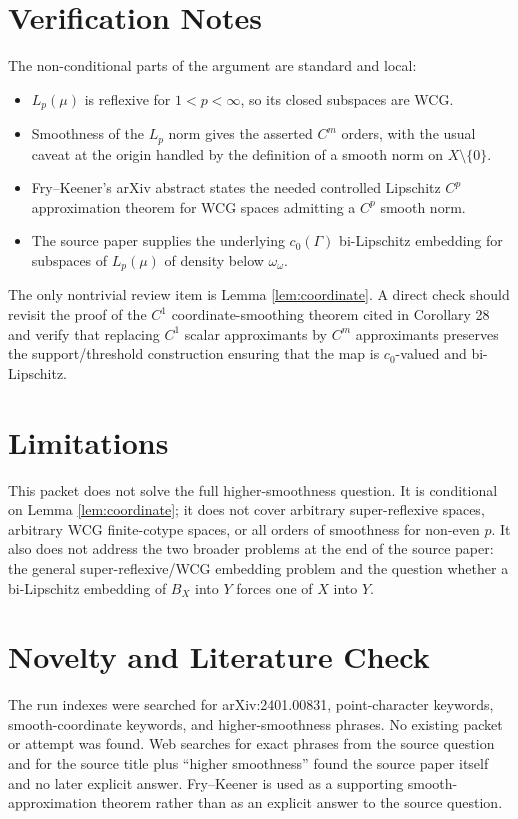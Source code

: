 \documentclass[11pt]{article}
\begin{document}
\section*{Verification Notes}

The non-conditional parts of the argument are standard and local:
\begin{itemize}
\item $L_p(\mu)$ is reflexive for $1<p<\infty$, so its closed subspaces are
WCG.
\item Smoothness of the $L_p$ norm gives the asserted $C^m$ orders, with the
usual caveat at the origin handled by the definition of a smooth norm on
$X\setminus\{0\}$.
\item Fry--Keener's arXiv abstract states the needed controlled Lipschitz
$C^p$ approximation theorem for WCG spaces admitting a $C^p$ smooth norm.
\item The source paper supplies the underlying $c_0(\Gamma)$ bi-Lipschitz
embedding for subspaces of $L_p(\mu)$ of density below $\omega_\omega$.
\end{itemize}

The only nontrivial review item is Lemma \ref{lem:coordinate}.  A direct check
should revisit the proof of the $C^1$ coordinate-smoothing theorem cited in
Corollary 28 and verify that replacing $C^1$ scalar approximants by $C^m$
approximants preserves the support/threshold construction ensuring that the
map is $c_0$-valued and bi-Lipschitz.

\section*{Limitations}

This packet does not solve the full higher-smoothness question.  It is
conditional on Lemma \ref{lem:coordinate}; it does not cover arbitrary
super-reflexive spaces, arbitrary WCG finite-cotype spaces, or all orders of
smoothness for non-even $p$.  It also does not address the two broader
problems at the end of the source paper: the general super-reflexive/WCG
embedding problem and the question whether a bi-Lipschitz embedding of $B_X$
into $Y$ forces one of $X$ into $Y$.

\section*{Novelty and Literature Check}

The run indexes were searched for arXiv:2401.00831, point-character keywords,
smooth-coordinate keywords, and higher-smoothness phrases.  No existing packet
or attempt was found.  Web searches for exact phrases from the source question
and for the source title plus ``higher smoothness'' found the source paper
itself and no later explicit answer.  Fry--Keener \cite{FryKeener09070241} is
used as a supporting smooth-approximation theorem rather than as an explicit
answer to the source question.
\end{document}
